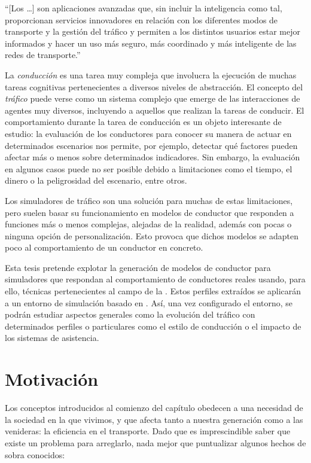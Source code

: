 \enquote{[Los  \ldots] son aplicaciones avanzadas que, sin incluir la inteligencia como tal, proporcionan servicios innovadores en relación con los diferentes modos de transporte y la gestión del tráfico y permiten a los distintos usuarios estar mejor informados y hacer un uso más seguro, más coordinado y más inteligente de las redes de transporte.}

La \textit{conducción} es una tarea muy compleja que involucra la ejecución de muchas tareas cognitivas pertenecientes a diversos niveles de abstracción. El concepto del \textit{tráfico} puede verse como un sistema complejo que emerge de las interacciones de agentes muy diversos, incluyendo a aquellos que realizan la tareas de conducir. El comportamiento durante la tarea de conducción es un objeto interesante de estudio: la evaluación de los conductores para conocer su manera de actuar en determinados escenarios nos permite, por ejemplo, detectar qué factores pueden afectar más o menos sobre determinados indicadores. Sin embargo, la evaluación en algunos casos puede no ser posible debido a limitaciones como el tiempo, el dinero o la peligrosidad del escenario, entre otros.

Los simuladores de tráfico son una solución para muchas de estas limitaciones, pero suelen basar su funcionamiento en modelos de conductor que responden a funciones más o menos complejas, alejadas de la realidad, además con pocas o ninguna opción de personalización. Esto provoca que dichos modelos se adapten poco al comportamiento de un conductor en concreto.

Esta tesis pretende explotar la generación de modelos de conductor para simuladores que respondan al comportamiento de conductores reales usando, para ello, técnicas pertenecientes al campo de la . Estos perfiles extraídos se aplicarán a un entorno de simulación basado en . Así, una vez configurado el entorno, se podrán estudiar aspectos generales como la evolución del tráfico con determinados perfiles o particulares como el estilo de conducción o el impacto de los sistemas de asistencia.

\section{Motivación}

Los conceptos introducidos al comienzo del capítulo obedecen a una necesidad de la sociedad en la que vivimos, y que afecta tanto a nuestra generación como a las venideras: la eficiencia en el transporte. Dado que es imprescindible saber que existe un problema para arreglarlo, nada mejor que puntualizar algunos hechos de sobra conocidos:

